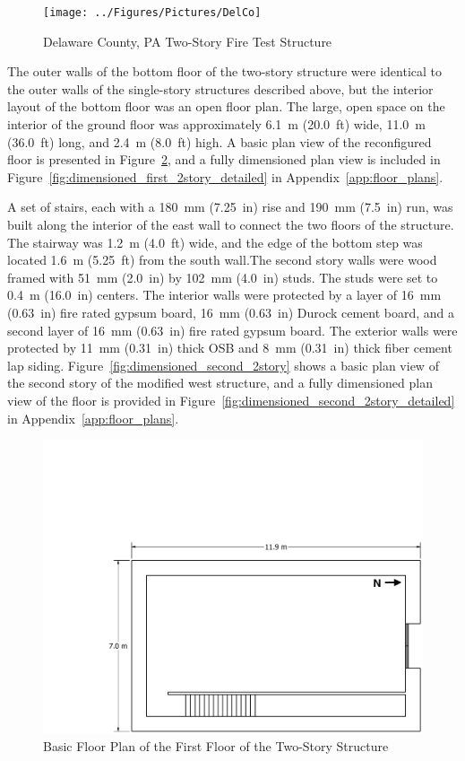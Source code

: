 \documentclass[12pt,oneside]{book}
\begin{document}
\begin{figure}[!ht]
	\texttt{[image: ../Figures/Pictures/DelCo]}
	\caption{Delaware County, PA Two-Story Fire Test Structure}
	\label{fig:delco_2story}
\end{figure}

The outer walls of the bottom floor of the two-story structure were identical to the outer walls of the single-story structures described above, but the interior layout of the bottom floor was an open floor plan. The large, open space on the interior of the ground floor was approximately 6.1~m (20.0~ft) wide, 11.0~m (36.0~ft) long, and 2.4~m (8.0~ft) high. A basic plan view of the reconfigured floor is presented in Figure~\ref{fig:dimensioned_first_2story}, and a fully dimensioned plan view is included in Figure~\ref{fig:dimensioned_first_2story_detailed} in Appendix~\ref{app:floor_plans}. 

A set of stairs, each with a 180~mm (7.25~in) rise and 190~mm (7.5~in) run, was built along the interior of the east wall to connect the two floors of the structure. The stairway was 1.2~m (4.0~ft) wide, and the edge of the bottom step was located 1.6~m (5.25~ft) from the south wall.The second story walls were wood framed with 51~mm (2.0~in) by 102~mm (4.0~in) studs. The studs were set to 0.4~m (16.0~in) centers. The interior walls were protected by a layer of 16~mm (0.63~in) fire rated gypsum board, 16~mm (0.63~in) Durock cement board, and a second layer of 16~mm (0.63~in) fire rated gypsum board. The exterior walls were protected by 11~mm (0.31~in) thick OSB and 8~mm (0.31~in) thick fiber cement lap siding. Figure~\ref{fig:dimensioned_second_2story} shows a basic plan view of the second story of the modified west structure, and a fully dimensioned plan view of the floor is provided in Figure~\ref{fig:dimensioned_second_2story_detailed} in Appendix~\ref{app:floor_plans}.

\begin{figure}[!ht]
	\includegraphics[width=\columnwidth]{../../DelCo_2014_2015/Drawings/PDFs/CAFS/West_Structure_1st_Floor_Plain}
	\caption{Basic Floor Plan of the First Floor of the Two-Story Structure}
	\label{fig:dimensioned_first_2story}
\end{figure}
\end{document}
